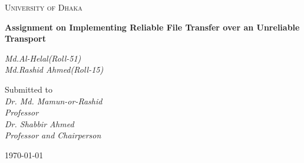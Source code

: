 \documentclass[12pt,a4paper]{report}
\begin{document}
\begin{titlepage}
\centering
{\scshape\LARGE University of Dhaka \par}
\vspace{1.5cm}
{\huge\bfseries Assignment on Implementing Reliable File Transfer over an Unreliable Transport\par}
\vspace{2cm}
{\Large\itshape Md.Al-Helal(Roll-51)\\Md.Rashid Ahmed(Roll-15)\par}
\vfill
Submitted to\\
\vspace{0.5cm}
{\itshape Dr. Md. Mamun-or-Rashid \\ Professor\vspace{0.3cm} \\Dr. Shabbir Ahmed \\Professor and Chairperson}
\vfill
{\large \today\par}
\end{titlepage}
\end{document}
